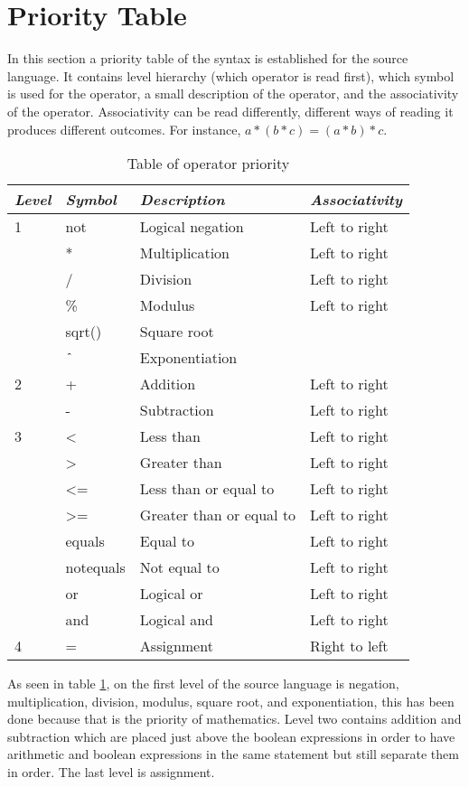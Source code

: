 \section{Priority Table}
In this section a priority table of the syntax is established for the source language. It contains level hierarchy (which operator is read first), which symbol is used for the operator, a small description of the operator, and the associativity of the operator. Associativity can be read differently, different ways of reading it produces different outcomes. For instance, $a * (b * c) = (a * b) * c$.
\begin{table}[H]
	\center
	\begin{tabular}{|l|l|l|l|}
	\hline
	\emph{Level} & \emph{Symbol} & \emph{Description} & \emph{Associativity} \\ 
 		\hline
 		1 & not & Logical negation & Left to right \\
 		& * & Multiplication & Left to right\\
 		& / & Division & Left to right\\
 		& \% & Modulus & Left to right\\
 		& sqrt() & Square root & \\
 		& $\texttt{\^{}}$ & Exponentiation &\\
 		\hline
 		2 & + & Addition & Left to right \\
 		& - & Subtraction & Left to right\\
 		\hline
 		3 & <  & Less than & Left to right \\
 		& > & Greater than & Left to right \\
 		& <= & Less than or equal to & Left to right \\
 		& >= & Greater than or equal to & Left to right \\
 		& equals & Equal to & Left to right \\
 		& notequals & Not equal to & Left to right \\
 		& or & Logical or & Left to right \\
 		& and & Logical and & Left to right\\
 		\hline
 		4 & = & Assignment & Right to left \\
 		\hline
	\end{tabular}
	\label{tab:priority}
	\caption{Table of operator priority}
\end{table} 
As seen in table \ref{tab:priority}, on the first level of the source language is negation, multiplication, division, modulus, square root, and exponentiation, this has been done because that is the priority of mathematics. Level two contains addition and subtraction which are placed just above the boolean expressions in order to have arithmetic and boolean expressions in the same statement but still separate them in order. The last level is assignment.